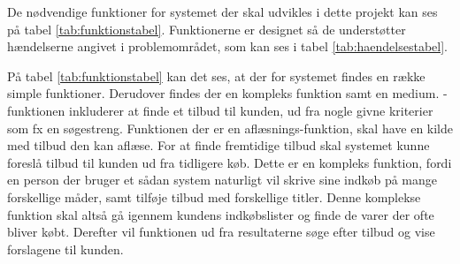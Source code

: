 De nødvendige funktioner for systemet der skal udvikles i dette projekt kan ses på tabel \ref{tab:funktionstabel}. Funktionerne er designet så de understøtter hændelserne angivet i problemområdet, som kan ses i tabel \ref{tab:haendelsestabel}.

På tabel \ref{tab:funktionstabel} kan det ses, at der for systemet findes en række simple funktioner. Derudover findes der en kompleks funktion samt en medium. -funktionen inkluderer at finde et tilbud til kunden, ud fra nogle givne kriterier som fx en søgestreng. Funktionen der er en aflæsnings-funktion, skal have en kilde med tilbud den kan aflæse. For at finde fremtidige tilbud skal systemet kunne foreslå tilbud til kunden ud fra tidligere køb. Dette er en kompleks funktion, fordi en person der bruger et sådan system naturligt vil skrive sine indkøb på mange forskellige måder, samt tilføje tilbud med forskellige titler. Denne komplekse funktion  skal altså gå igennem kundens indkøbslister og finde de varer der ofte bliver købt. Derefter vil funktionen ud fra resultaterne søge efter tilbud og vise forslagene til kunden.